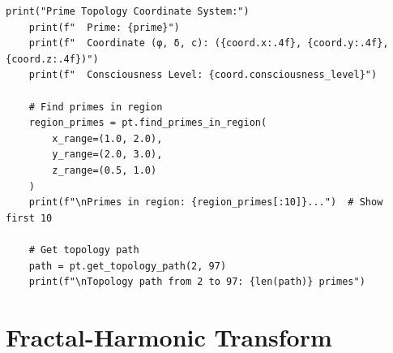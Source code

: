 \begin{lstlisting}[caption={Prime Topology Coordinate System Implementation},label={code:prime_topology}]
    print("Prime Topology Coordinate System:")
    print(f"  Prime: {prime}")
    print(f"  Coordinate (φ, δ, c): ({coord.x:.4f}, {coord.y:.4f}, {coord.z:.4f})")
    print(f"  Consciousness Level: {coord.consciousness_level}")
    
    # Find primes in region
    region_primes = pt.find_primes_in_region(
        x_range=(1.0, 2.0),
        y_range=(2.0, 3.0),
        z_range=(0.5, 1.0)
    )
    print(f"\nPrimes in region: {region_primes[:10]}...")  # Show first 10
    
    # Get topology path
    path = pt.get_topology_path(2, 97)
    print(f"\nTopology path from 2 to 97: {len(path)} primes")
\end{lstlisting}

\section{Fractal-Harmonic Transform}

